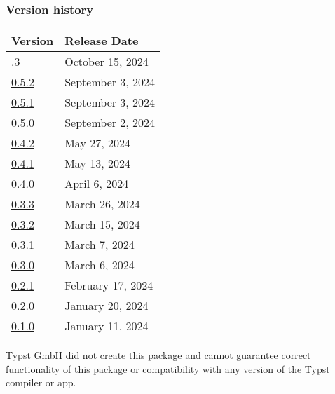 \label{versions}
\subsubsection{Version history}\label{version-history}

\begin{longtable}[]{@{}ll@{}}
\toprule\noalign{}
Version & Release Date \\
\midrule\noalign{}
\endhead
\bottomrule\noalign{}
\endlastfoot
0.5.3 & October 15, 2024 \\
\href{https://typst.app/universe/package/touying/0.5.2/}{0.5.2} &
September 3, 2024 \\
\href{https://typst.app/universe/package/touying/0.5.1/}{0.5.1} &
September 3, 2024 \\
\href{https://typst.app/universe/package/touying/0.5.0/}{0.5.0} &
September 2, 2024 \\
\href{https://typst.app/universe/package/touying/0.4.2/}{0.4.2} & May
27, 2024 \\
\href{https://typst.app/universe/package/touying/0.4.1/}{0.4.1} & May
13, 2024 \\
\href{https://typst.app/universe/package/touying/0.4.0/}{0.4.0} & April
6, 2024 \\
\href{https://typst.app/universe/package/touying/0.3.3/}{0.3.3} & March
26, 2024 \\
\href{https://typst.app/universe/package/touying/0.3.2/}{0.3.2} & March
15, 2024 \\
\href{https://typst.app/universe/package/touying/0.3.1/}{0.3.1} & March
7, 2024 \\
\href{https://typst.app/universe/package/touying/0.3.0/}{0.3.0} & March
6, 2024 \\
\href{https://typst.app/universe/package/touying/0.2.1/}{0.2.1} &
February 17, 2024 \\
\href{https://typst.app/universe/package/touying/0.2.0/}{0.2.0} &
January 20, 2024 \\
\href{https://typst.app/universe/package/touying/0.1.0/}{0.1.0} &
January 11, 2024 \\
\end{longtable}

Typst GmbH did not create this package and cannot guarantee correct
functionality of this package or compatibility with any version of the
Typst compiler or app.
